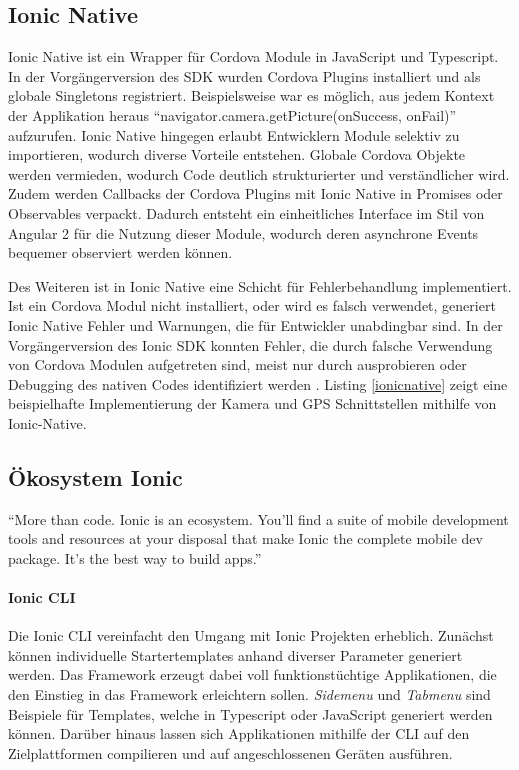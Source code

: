 \subsection{Ionic Native}

Ionic Native ist ein Wrapper für Cordova Module in JavaScript und Typescript.
In der Vorgängerversion des \ac{SDK} wurden Cordova Plugins installiert und als globale Singletons registriert.
Beispielsweise war es möglich, aus jedem Kontext der Applikation heraus ``navigator.camera.getPicture(onSuccess, onFail)'' aufzurufen.
Ionic Native hingegen erlaubt Entwicklern Module selektiv zu importieren, wodurch diverse Vorteile entstehen.
Globale Cordova Objekte werden vermieden, wodurch Code deutlich strukturierter und verständlicher wird.
Zudem werden Callbacks der Cordova Plugins mit Ionic Native in Promises oder Observables verpackt.
Dadurch entsteht ein einheitliches Interface im Stil von Angular 2 für die Nutzung dieser Module,
wodurch deren asynchrone Events bequemer observiert werden können.

Des Weiteren ist in Ionic Native eine Schicht für Fehlerbehandlung implementiert.
Ist ein Cordova Modul nicht installiert, oder wird es falsch verwendet,
generiert Ionic Native Fehler und Warnungen, die für Entwickler unabdingbar sind.
In der Vorgängerversion des Ionic \ac{SDK} konnten Fehler, die durch falsche Verwendung von
Cordova Modulen aufgetreten sind, meist nur durch ausprobieren oder Debugging des nativen Codes identifiziert werden
\cite{ionic55:online}.
Listing \ref{ionicnative} zeigt eine beispielhafte Implementierung der Kamera und GPS Schnittstellen mithilfe von Ionic-Native.

\vspace{0.3cm}



\subsection{Ökosystem Ionic}

``More than code. Ionic is an ecosystem. You'll find a suite of mobile development tools and resources at your disposal that make
Ionic the complete mobile dev package. It's the best way to build apps.'' \cite{Ionic20:online}
\vspace{0.3cm}

\paragraph{Ionic \ac{CLI}}
Die Ionic \ac{CLI} vereinfacht den Umgang mit Ionic Projekten erheblich. Zunächst können individuelle
Startertemplates anhand diverser Parameter generiert werden.
Das Framework erzeugt dabei voll funktionstüchtige Applikationen, die den Einstieg in das Framework erleichtern sollen.
\emph{Sidemenu} und \emph{Tabmenu} sind Beispiele für Templates, welche in Typescript oder JavaScript generiert werden können.
Darüber hinaus lassen sich Applikationen mithilfe der \ac{CLI} auf den Zielplattformen compilieren und auf angeschlossenen Geräten ausführen.

